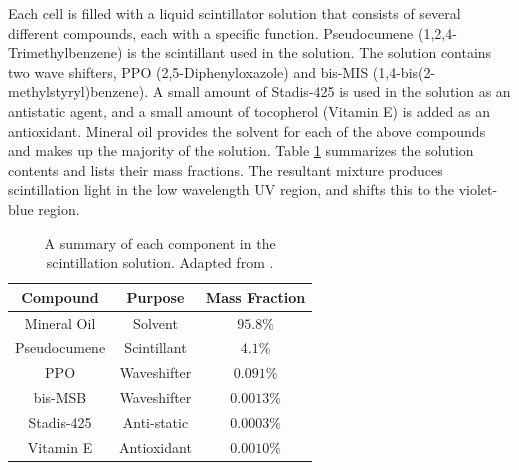 Each cell is filled with a liquid scintillator solution that consists of several different compounds, each with a specific function. Pseudocumene ({1,2,4-Trimethylbenzene}) is the scintillant used in the solution. The solution contains two wave shifters, PPO (2,5-Diphenyloxazole) and bis-MIS (1,4-bis(2-methylstyryl)\linebreak benzene). A small amount of Stadis-425 is used in the solution as an antistatic agent, and a small amount of tocopherol (Vitamin E) is added as an antioxidant. Mineral oil provides the solvent for each of the above compounds and makes up the majority of the solution. Table \ref{tab:scintillator} summarizes the solution contents and lists their mass fractions. The resultant mixture produces scintillation light in the low wavelength UV region, and shifts this to the violet-blue region.
\begin{table}[h]
  \begin{center}
    \begin{tabular}{c c c}
      \hline\hline
      Compound & Purpose & Mass Fraction \\
      \hline
      Mineral Oil & Solvent & $95.8\%$ \\
      Pseudocumene & Scintillant & $4.1\%$ \\
      PPO & Waveshifter & $0.091\%$ \\
      bis-MSB & Waveshifter & $0.0013\%$ \\
      Stadis-425 & Anti-static & $0.0003\%$ \\
      Vitamin E & Antioxidant & $0.0010\%$ \\
      \hline
    \end{tabular}
    \caption[Scintillator Solution Summary]{A summary of each component in the scintillation solution. Adapted from \cite{ref:TDRNOvA}.}
    \label{tab:scintillator}
  \end{center}
\end{table}

